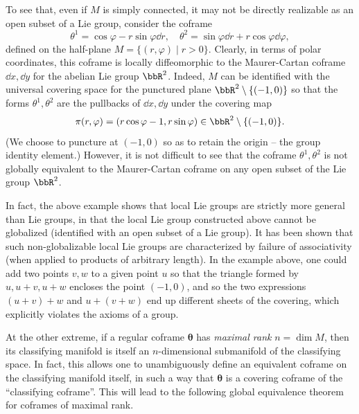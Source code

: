 \begin{example}
    To see that, even if $M$ is simply connected, it may not be directly realizable as an open subset of a Lie group, consider the coframe 
    \[\theta^1=\cos\varphi-r\sin\varphi\dd r,\quad \theta^2=\sin\varphi\dd r+r\cos\varphi\dd\varphi,\]
    defined on the half-plane $M=\{(r,\varphi)\mid r>0\}$. Clearly, in terms of polar coordinates, this coframe is locally diffeomorphic to the Maurer-Cartan coframe $\dd x,\dd y$ for the abelian Lie group $\bbR^2$. Indeed, $M$ can be identified with the universal covering space for the punctured plane $\bbR^2\setminus\{(-1,0)\}$ so that the forms $\theta^1,\theta^2$ are the pullbacks of $\dd x,\dd y$ under the covering map 
    \[\pi(r,\varphi)=(r\cos\varphi-1,r\sin\varphi)\in\bbR^2\setminus\{(-1,0)\}.\]
    (We choose to puncture at $(-1,0)$ so as to retain the origin -- the group identity element.) However, it is not difficult to see that the coframe $\theta^1,\theta^2$ is not globally equivalent to the Maurer-Cartan coframe on any open subset of the Lie group $\bbR^2$.
\end{example}

\begin{rem}
    In fact, the above example shows that local Lie groups are strictly more general than Lie groups, in that the local Lie group constructed above cannot be globalized (identified with an open subset of a Lie group). It has been shown that such non-globalizable local Lie groups are characterized by failure of associativity (when applied to products of arbitrary length). In the example above, one could add two points $v,w$ to a given point $u$ so that the triangle formed by $u,u+v,u+w$ encloses the point $(-1,0)$, and so the two expressions $(u+v)+w$ and $u+(v+w)$ end up different sheets of the covering, which explicitly violates the axioms of a group.
\end{rem}

At the other extreme, if a regular coframe $\bm\theta$ has \emph{maximal rank} $n=\dim M$, then its classifying manifold is itself an $n$-dimensional submanifold of the classifying space. In fact, this allows one to unambiguously define an equivalent coframe on the classifying manifold itself, in such a way that $\bm\theta$ is a covering coframe of the ``classifying coframe''. This will lead to the following global equivalence theorem for coframes of maximal rank.

